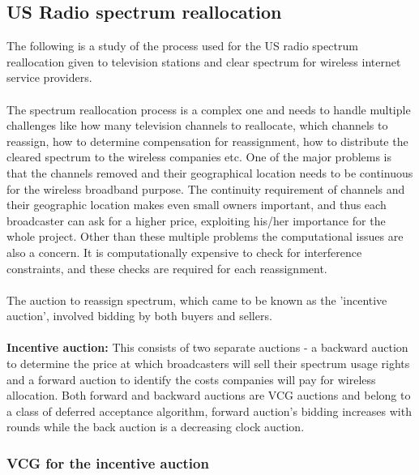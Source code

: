 \documentclass[a4paper]{article}
\begin{document}
\pagebreak
\subsection*{US Radio spectrum reallocation}

The following is a study of the process used for the US radio spectrum reallocation given to television stations and clear spectrum for wireless internet service providers.
\\\\
The spectrum reallocation process is a complex one and needs to handle multiple challenges like how many television channels to reallocate, which channels to reassign, how to determine compensation for reassignment, how to distribute the cleared spectrum to the wireless companies etc. One of the major problems is that the channels removed and their geographical location needs to be continuous for the wireless broadband purpose. The continuity requirement of channels and their geographic location makes even small owners important, and thus each broadcaster can ask for a higher price, exploiting his/her importance for the whole project. Other than these multiple problems the computational issues are also a concern. It is computationally expensive to check for interference constraints, and these checks are required for each reassignment.
\\\\
The auction to reassign spectrum, which came to be known as the 'incentive auction', involved bidding by both buyers and sellers.
\\\\
\textbf{Incentive auction:} This consists of two separate auctions - a backward auction to determine the price at which broadcasters will sell their spectrum usage rights and a forward auction to identify the costs companies will pay for wireless allocation. Both forward and backward auctions are VCG auctions and belong to a class of deferred acceptance algorithm, forward auction's bidding increases with rounds while the back auction is a decreasing clock auction.

\subsubsection*{VCG for the incentive auction}
\end{document}
